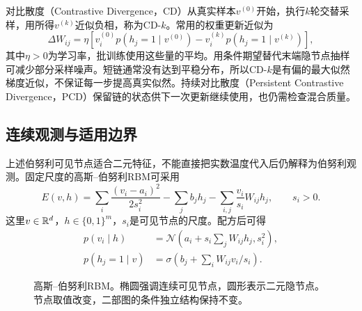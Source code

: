 对比散度（Contrastive Divergence，CD）从真实样本$v^{(0)}$开始，执行$k$轮交替采样，用所得$v^{(k)}$近似负相，称为CD-$k$。常用的权重更新近似为
\begin{equation}
 \Delta W_{ij}=\eta\left[
 v_i^{(0)}p(h_j=1\mid v^{(0)})
 -v_i^{(k)}p(h_j=1\mid v^{(k)})\right],
\end{equation}
其中$\eta>0$为学习率，批训练使用这些量的平均。用条件期望替代末端隐节点抽样可减少部分采样噪声。短链通常没有达到平稳分布，所以CD-$k$是有偏的最大似然梯度近似，不保证每一步提高真实似然。持续对比散度（Persistent Contrastive Divergence，PCD）保留链的状态供下一次更新继续使用，也仍需检查混合质量。

\subsection{连续观测与适用边界}
上述伯努利可见节点适合二元特征，不能直接把实数温度代入后仍解释为伯努利观测。固定尺度的高斯--伯努利RBM可采用
\begin{equation}
 E(v,h)=\sum_i\frac{(v_i-a_i)^2}{2s_i^2}
 -\sum_jb_jh_j-\sum_{i,j}\frac{v_i}{s_i}W_{ij}h_j,
 \qquad s_i>0.
\end{equation}
这里$v\in\mathbb{R}^d$，$h\in\{0,1\}^m$，$s_i$是可见节点的尺度。配方后可得
\begin{align}
 p(v_i\mid h)&=\mathcal N\left(a_i+s_i\sum_jW_{ij}h_j,s_i^2\right),\\
 p(h_j=1\mid v)&=\sigma\left(b_j+\sum_iW_{ij}v_i/s_i\right).
\end{align}
\begin{figure}[htbp]
\centering
{}
\caption{高斯--伯努利RBM。椭圆强调连续可见节点，圆形表示二元隐节点。节点取值改变，二部图的条件独立结构保持不变。}
\label{fig:bayes-gaussian-rbm}
\end{figure}

